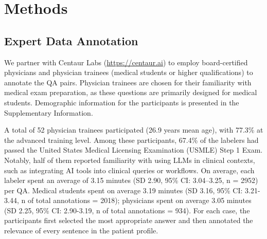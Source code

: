 \documentclass[fleqn,10pt]{wlscirep}
\begin{document}

\section{Methods}


\subsection{Expert Data Annotation}

We partner with Centaur Labs (\url{https://centaur.ai}) to employ board-certified physicians and physician trainees (medical students or higher qualifications) to annotate the QA pairs. Physician trainees are chosen for their familiarity with medical exam preparation, as these questions are primarily designed for medical students. Demographic information for the participants is presented in the Supplementary Information.

A total of 52 physician trainees participated (26.9 years mean age), with 77.3\% at the advanced training level. Among these participants, 67.4\% of the labelers had passed the United States Medical Licensing Examination (USMLE) Step 1 Exam. Notably, half of them reported familiarity with using LLMs in clinical contexts, such as integrating AI tools into clinical queries or workflows. On average, each labeler spent an average of 3.15 minutes (SD 2.90, 95\% CI: 3.04–3.25, n = 2952) per QA. Medical students spent on average 3.19 minutes (SD 3.16, 95\% CI: 3.21-3.44, n of total annotations = 2018); physicians spent on average 3.05 minutes (SD 2.25, 95\% CI: 2.90-3.19, n of total annotations = 934). For each case, the participants first selected the most appropriate answer and then annotated the relevance of every sentence in the patient profile.
\end{document}
